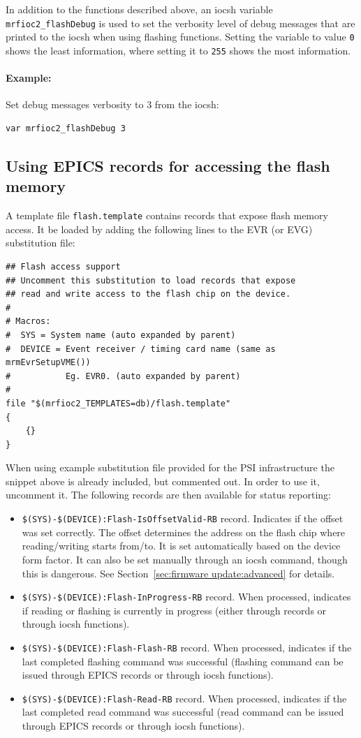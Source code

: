 \documentclass[12pt,a4paper]{article}
\begin{document}
In addition to the functions described above, an iocsh variable \texttt{mrfioc2\_flashDebug} is used to set the verbosity level of debug messages that are printed to the iocsh when using flashing functions. Setting the variable to value \texttt{0} shows the least information, where setting it to \texttt{255} shows the most information.

\paragraph{Example:} Set debug messages verbosity to 3 from the iocsh:
\begin{verbatim}
var mrfioc2_flashDebug 3
\end{verbatim}

\subsection{Using EPICS records for accessing the flash memory}
A template file \texttt{flash.template} contains records that expose flash memory access. It be loaded by adding the following lines to the EVR (or EVG) substitution file:
\begin{verbatim}
## Flash access support
## Uncomment this substitution to load records that expose
## read and write access to the flash chip on the device.
#
# Macros:
#  SYS = System name (auto expanded by parent)
#  DEVICE = Event receiver / timing card name (same as mrmEvrSetupVME())
#           Eg. EVR0. (auto expanded by parent)
# 
file "$(mrfioc2_TEMPLATES=db)/flash.template" 
{
	{}
}
\end{verbatim}
When using example substitution file provided for the PSI infrastructure the snippet above is already included, but commented out. In order to use it, uncomment it.
The following records are then available for status reporting:
\begin{itemize}
	\item \texttt{\$(SYS)-\$(DEVICE):Flash-IsOffsetValid-RB} record. Indicates if the offset was set correctly. The offset determines the address on the flash chip where reading/writing starts from/to. It is set automatically based on the device form factor. It can also be set manually through an iocsh command, though this is dangerous. See Section~\ref{sec:firmware update:advanced} for details.
	\item \texttt{\$(SYS)-\$(DEVICE):Flash-InProgress-RB} record. When processed, indicates if reading or flashing is currently in progress (either through records or through iocsh functions).
	\item \texttt{\$(SYS)-\$(DEVICE):Flash-Flash-RB} record. When processed, indicates if the last completed flashing command was successful (flashing command can be issued through EPICS records or through iocsh functions).
	\item \texttt{\$(SYS)-\$(DEVICE):Flash-Read-RB} record. When processed, indicates if the last completed read command was successful (read command can be issued through EPICS records or through iocsh functions).
\end{itemize}
\end{document}
